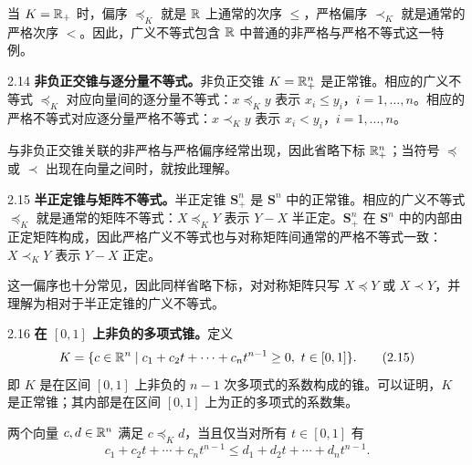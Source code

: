当 $K=\mathbb R_+$ 时，偏序 $\preceq_K$ 就是 $\mathbb R$ 上通常的次序 $\le$，严格偏序 $\prec_K$ 就是通常的严格次序 $<$。因此，广义不等式包含 $\mathbb R$ 中普通的非严格与严格不等式这一特例。

\begin{origexample}{2.14}
\textbf{非负正交锥与逐分量不等式。}非负正交锥 $K=\mathbb R_+^n$ 是正常锥。相应的广义不等式 $\preceq_K$ 对应向量间的逐分量不等式：$x\preceq_K y$ 表示 $x_i\le y_i$，$i=1,\ldots,n$。相应的严格不等式对应逐分量严格不等式：$x\prec_K y$ 表示 $x_i<y_i$，$i=1,\ldots,n$。

与非负正交锥关联的非严格与严格偏序经常出现，因此省略下标 $\mathbb R_+^n$；当符号 $\preceq$ 或 $\prec$ 出现在向量之间时，就按此理解。
\end{origexample}

\begin{origexample}{2.15}
\textbf{半正定锥与矩阵不等式。}半正定锥 $\mathbf S_+^n$ 是 $\mathbf S^n$ 中的正常锥。相应的广义不等式 $\preceq_K$ 就是通常的矩阵不等式：$X\preceq_K Y$ 表示 $Y-X$ 半正定。$\mathbf S_+^n$ 在 $\mathbf S^n$ 中的内部由正定矩阵构成，因此严格广义不等式也与对称矩阵间通常的严格不等式一致：$X\prec_K Y$ 表示 $Y-X$ 正定。

这一偏序也十分常见，因此同样省略下标，对对称矩阵只写 $X\preceq Y$ 或 $X\prec Y$，并理解为相对于半正定锥的广义不等式。
\end{origexample}

\begin{origexample}{2.16}
\textbf{在 $[0,1]$ 上非负的多项式锥。}定义
\begin{equation}
 K=\{c\in\R^n\mid c_1+c_2t+\cdots+c_nt^{n-1}\ge0,\ t\in[0,1]\}.\tag{2.15}
\end{equation}
即 $K$ 是在区间 $[0,1]$ 上非负的 $n-1$ 次多项式的系数构成的锥。可以证明，$K$ 是正常锥；其内部是在区间 $[0,1]$ 上为正的多项式的系数集。

两个向量 $c,d\in\mathbb R^n$ 满足 $c\preceq_K d$，当且仅当对所有 $t\in[0,1]$ 有
\[
 c_1+c_2t+\cdots+c_nt^{n-1}
 \le d_1+d_2t+\cdots+d_nt^{n-1}.
\]
\end{origexample}

